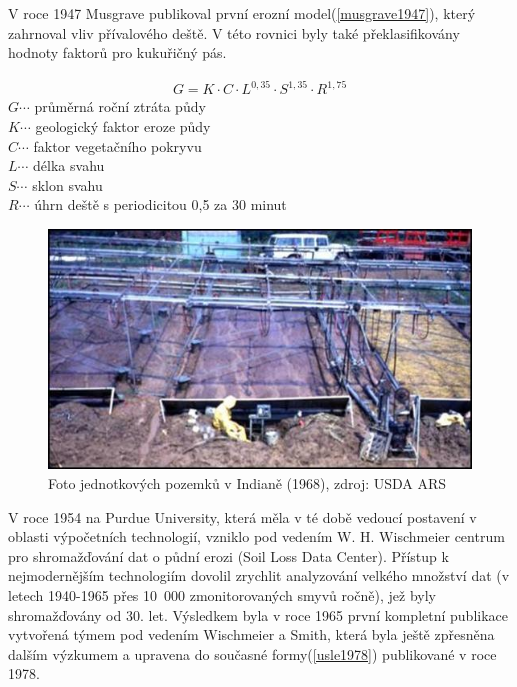 V roce 1947 Musgrave publikoval první erozní model(\ref{musgrave1947}), který zahrnoval vliv přívalového deště. V této rovnici byly také překlasifikovány hodnoty faktorů pro kukuřičný pás.\cite{MUSGRAVE1947}

\begin{align}
   \label{musgrave1947} G=K\cdot C\cdot L^{0,35}\cdot S^{1,35}\cdot R^{1,75}
\end{align}
\hspace*{2cm}$G \cdots$ průměrná roční ztráta půdy\\
\hspace*{2cm}$K \cdots$ geologický faktor eroze půdy \\ 
\hspace*{2cm}$C \cdots$ faktor vegetačního pokryvu \\
\hspace*{2cm}$L \cdots$ délka svahu \\ 
\hspace*{2cm}$S \cdots$ sklon svahu \\  
\hspace*{2cm}$R \cdots$ úhrn deště s periodicitou 0,5 za 30 minut \\
\begin{figure}[H]
    \centering
      \includegraphics[scale=0.85]{./pictures/unit_plots2.jpg}
      \caption[Foto jednotkových pozemků v Indianě (1968)]{Foto jednotkových pozemků v Indianě (1968), zdroj: USDA ARS\cite{usda_ars}}
      \label{fig:unit_plots}
\end{figure}
V roce 1954 na Purdue University, která měla v té době vedoucí postavení v oblasti výpočetních technologií, vzniklo pod vedením W. H. Wischmeier centrum pro shromažďování dat o půdní erozi (Soil Loss Data Center). Přístup k nejmodernějším technologiím dovolil zrychlit analyzování velkého množství dat (v letech 1940-1965 přes 10~000 zmonitorovaných smyvů ročně), jež byly shromažďovány od 30. let. Výsledkem byla v roce 1965 první kompletní publikace vytvořená týmem pod vedením Wischmeier a Smith, která byla ještě zpřesněna dalším výzkumem a upravena do současné formy(\ref{usle1978}) publikované v roce 1978.\cite{usle1978}

